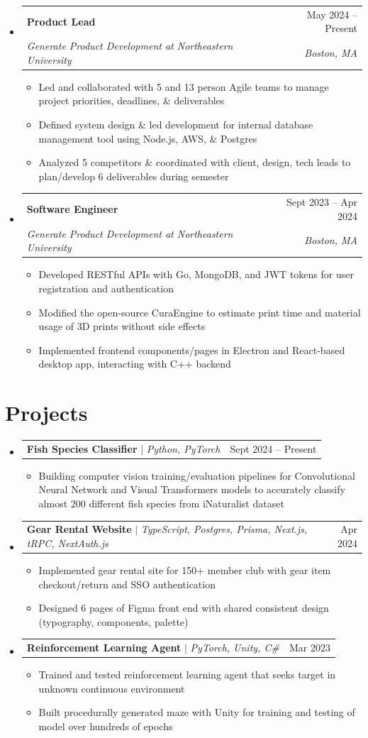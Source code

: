 \documentclass[letterpaper,11pt]{article}
\makeatletter
\newcommand{\resumeItem}[1]{
  \item\small{
    {#1 \vspace{-2pt}}
  }
}
\newcommand{\resumeSubheading}[4]{
  \vspace{-2pt}\item
    \begin{tabular*}{0.97\textwidth}[t]{l@{\extracolsep{\fill}}r}
      \textbf{#1} & #2 \\
      \textit{\small#3} & \textit{\small #4} \\
    \end{tabular*}\vspace{-7pt}
}
\newcommand{\resumeProjectHeading}[2]{
    \item
    \begin{tabular*}{0.97\textwidth}{l@{\extracolsep{\fill}}r}
      \small#1 & #2 \\
    \end{tabular*}\vspace{-7pt}
}
\newcommand{\resumeSubHeadingListStart}{\begin{itemize}[leftmargin=0.15in, label={}]}
\newcommand{\resumeSubHeadingListEnd}{\end{itemize}}
\newcommand{\resumeItemListStart}{\begin{itemize}}
\newcommand{\resumeItemListEnd}{\end{itemize}\vspace{-5pt}}
\makeatother
\begin{document}
\resumeSubHeadingListStart

\section{Extracurricular}
\resumeSubheading
{Product Lead}{May 2024 -- Present}
{Generate Product Development at Northeastern University}{Boston, MA}
\resumeItemListStart
\resumeItem{Led and collaborated with 5 and 13 person Agile teams to manage project priorities, deadlines, \& deliverables}
\resumeItem{Defined system design \& led development for internal database management tool using Node.js, AWS, \& Postgres}
\resumeItem{Analyzed 5 competitors \& coordinated with client, design, tech leads to plan/develop 6 deliverables during semester}
\resumeItemListEnd
\resumeSubheading
{Software Engineer}{Sept 2023 -- Apr 2024}
{Generate Product Development at Northeastern University}{Boston, MA}
\resumeItemListStart
\resumeItem{Developed RESTful APIs with Go, MongoDB, and JWT tokens for user registration and authentication}
\resumeItem{Modified the open-source CuraEngine to estimate print time and material usage of 3D prints without side effects}
\resumeItem{Implemented frontend components/pages in Electron and React-based desktop app, interacting with C++ backend}
\resumeItemListEnd

\resumeSubHeadingListEnd

\section{Projects}
\resumeSubHeadingListStart
\resumeProjectHeading
{\textbf{Fish Species Classifier} $|$ \emph{Python, PyTorch}}{Sept 2024 -- Present}
\resumeItemListStart
\resumeItem{Building computer vision training/evaluation pipelines for Convolutional Neural Network and Visual Transformers models to accurately classify almost 200 different fish species from iNaturalist dataset}
\resumeItemListEnd
\resumeProjectHeading
{\textbf{Gear Rental Website} $|$ \emph{TypeScript, Postgres, Prisma, Next.js, tRPC, NextAuth.js}}{Apr 2024}
\resumeItemListStart
\resumeItem{Implemented gear rental site for 150+ member club with gear item checkout/return and SSO authentication}
\resumeItem{Designed 6 pages of Figma front end with shared consistent design (typography, components, palette)}
\resumeItemListEnd
\resumeProjectHeading
{\textbf{Reinforcement Learning Agent} $|$ \emph{PyTorch, Unity, C\#}}{Mar 2023}
\resumeItemListStart
\resumeItem{Trained and tested reinforcement learning agent that seeks target in unknown continuous environment}
\resumeItem{Built procedurally generated maze with Unity for training and testing of model over hundreds of epochs}
\resumeItemListEnd
\resumeSubHeadingListEnd
\end{document}
